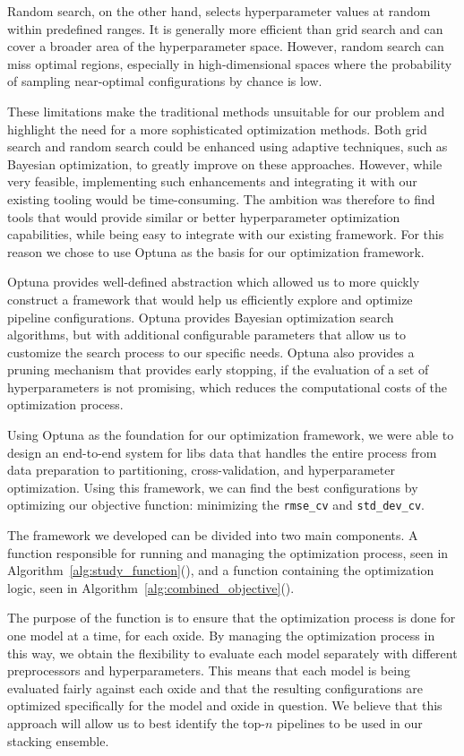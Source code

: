 Random search, on the other hand, selects hyperparameter values at random within predefined ranges. 
It is generally more efficient than grid search and can cover a broader area of the hyperparameter space. 
However, random search can miss optimal regions, especially in high-dimensional spaces where the probability of sampling near-optimal configurations by chance is low. 

These limitations make the traditional methods unsuitable for our problem and highlight the need for a more sophisticated optimization methods.
Both grid search and random search could be enhanced using adaptive techniques, such as Bayesian optimization, to greatly improve on these approaches.
However, while very feasible, implementing such enhancements and integrating it with our existing tooling would be time-consuming.
The ambition was therefore to find tools that would provide similar or better hyperparameter optimization capabilities, while being easy to integrate with our existing framework.
For this reason we chose to use Optuna as the basis for our optimization framework.

Optuna provides well-defined abstraction which allowed us to more quickly construct a framework that would help us efficiently explore and optimize pipeline configurations\cite{optuna_2019}.
Optuna provides Bayesian optimization search algorithms, but with additional configurable parameters that allow us to customize the search process to our specific needs.
Optuna also provides a pruning mechanism that provides early stopping, if the evaluation of a set of hyperparameters is not promising, which reduces the computational costs of the optimization process.

Using Optuna as the foundation for our optimization framework, we were able to design an end-to-end system for \gls{libs} data that handles the entire process from data preparation to partitioning, cross-validation, and hyperparameter optimization.
Using this framework, we can find the best configurations by optimizing our objective function: minimizing the \texttt{rmse_cv} and \texttt{std_dev_cv}.

The framework we developed can be divided into two main components.
A function responsible for running and managing the optimization process, seen in Algorithm~\ref{alg:study_function}(), and a function containing the optimization logic, seen in Algorithm~\ref{alg:combined_objective}().

The purpose of the  function is to ensure that the optimization process is done for one model at a time, for each oxide.
By managing the optimization process in this way, we obtain the flexibility to evaluate each model separately with different preprocessors and hyperparameters.
This means that each model is being evaluated fairly against each oxide and that the resulting configurations are optimized specifically for the model and oxide in question.
We believe that this approach will allow us to best identify the top-$n$ pipelines to be used in our stacking ensemble.

